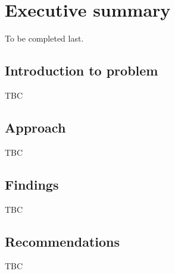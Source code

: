 \chapter*{Executive summary}
To be completed last.

\section*{Introduction to problem}
TBC

\section*{Approach}
TBC

\section*{Findings}
TBC

\section*{Recommendations}
TBC